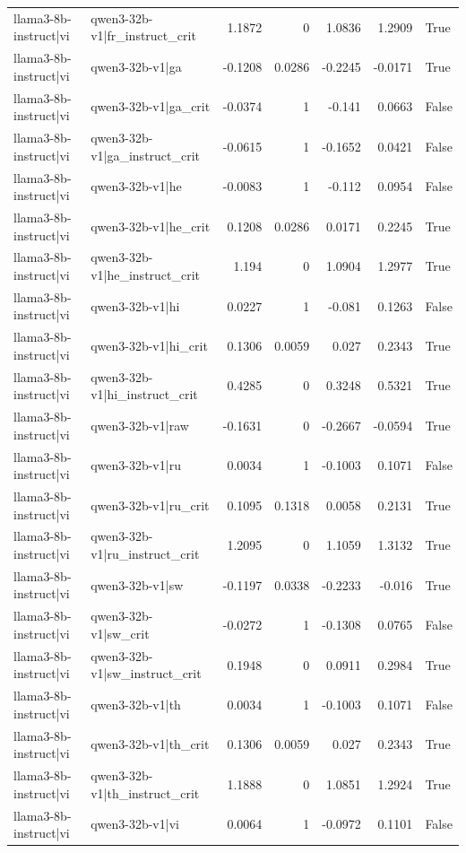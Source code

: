 \begin{table}
\begin{tabular}{l l r r r r l}
llama3-8b-instruct|vi & qwen3-32b-v1|fr_instruct_crit & 1.1872 & 0 & 1.0836 & 1.2909 & True \\
llama3-8b-instruct|vi & qwen3-32b-v1|ga & -0.1208 & 0.0286 & -0.2245 & -0.0171 & True \\
llama3-8b-instruct|vi & qwen3-32b-v1|ga_crit & -0.0374 & 1 & -0.141 & 0.0663 & False \\
llama3-8b-instruct|vi & qwen3-32b-v1|ga_instruct_crit & -0.0615 & 1 & -0.1652 & 0.0421 & False \\
llama3-8b-instruct|vi & qwen3-32b-v1|he & -0.0083 & 1 & -0.112 & 0.0954 & False \\
llama3-8b-instruct|vi & qwen3-32b-v1|he_crit & 0.1208 & 0.0286 & 0.0171 & 0.2245 & True \\
llama3-8b-instruct|vi & qwen3-32b-v1|he_instruct_crit & 1.194 & 0 & 1.0904 & 1.2977 & True \\
llama3-8b-instruct|vi & qwen3-32b-v1|hi & 0.0227 & 1 & -0.081 & 0.1263 & False \\
llama3-8b-instruct|vi & qwen3-32b-v1|hi_crit & 0.1306 & 0.0059 & 0.027 & 0.2343 & True \\
llama3-8b-instruct|vi & qwen3-32b-v1|hi_instruct_crit & 0.4285 & 0 & 0.3248 & 0.5321 & True \\
llama3-8b-instruct|vi & qwen3-32b-v1|raw & -0.1631 & 0 & -0.2667 & -0.0594 & True \\
llama3-8b-instruct|vi & qwen3-32b-v1|ru & 0.0034 & 1 & -0.1003 & 0.1071 & False \\
llama3-8b-instruct|vi & qwen3-32b-v1|ru_crit & 0.1095 & 0.1318 & 0.0058 & 0.2131 & True \\
llama3-8b-instruct|vi & qwen3-32b-v1|ru_instruct_crit & 1.2095 & 0 & 1.1059 & 1.3132 & True \\
llama3-8b-instruct|vi & qwen3-32b-v1|sw & -0.1197 & 0.0338 & -0.2233 & -0.016 & True \\
llama3-8b-instruct|vi & qwen3-32b-v1|sw_crit & -0.0272 & 1 & -0.1308 & 0.0765 & False \\
llama3-8b-instruct|vi & qwen3-32b-v1|sw_instruct_crit & 0.1948 & 0 & 0.0911 & 0.2984 & True \\
llama3-8b-instruct|vi & qwen3-32b-v1|th & 0.0034 & 1 & -0.1003 & 0.1071 & False \\
llama3-8b-instruct|vi & qwen3-32b-v1|th_crit & 0.1306 & 0.0059 & 0.027 & 0.2343 & True \\
llama3-8b-instruct|vi & qwen3-32b-v1|th_instruct_crit & 1.1888 & 0 & 1.0851 & 1.2924 & True \\
llama3-8b-instruct|vi & qwen3-32b-v1|vi & 0.0064 & 1 & -0.0972 & 0.1101 & False \\

\end{tabular}
\end{table}
